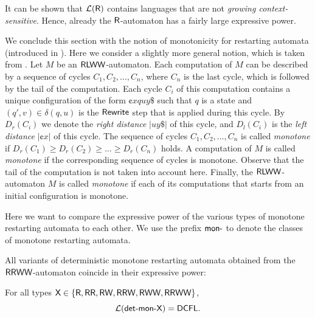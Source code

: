 It can be shown that ${\mathcal{L}}(\mbox{\sf R})$ contains languages that are not \emph{growing context-sensitive}. Hence, already the $\mbox{\sf R}$-automaton has a fairly large expressive power.

We conclude this section with the notion of monotonicity for restarting automata (introduced in \cite{JMPV97}). Here we consider a slightly more general notion, which is taken from \cite{JMPV07}. Let $M$ be an  $\mbox{\sf RLWW}$-automaton. Each computation of $M$ can be described by a sequence of cycles $C_1, C_2, \ldots, C_n$, where $C_n$ is the last cycle, which is followed by the tail of the computation. Each cycle $C_i$ of this computation contains a unique configuration of the form $\cent x q u y \$$ such that $q$ is a state and $(q', v) \in \delta(q, u)$ is the \index{$\Rewrite$}$\Rewrite$ step that is applied during this cycle. By $D_r(C_i)$ we denote the \emph{right distance} $|u y \$|$ of this cycle, and $D_l(C_i)$ is the \emph{left distance} $|\cent x|$ of this cycle. The sequence of cycles $C_1, C_2, \ldots, C_n$ is called \emph{monotone} if $D_r(C_1) \ge D_r(C_2) \ge \ldots \ge D_r(C_n)$ holds. A computation of $M$ is called \emph{monotone} if the corresponding sequence of cycles is monotone. Observe that the tail of the computation is not taken into account here. Finally, the $\mbox{\sf RLWW}$-automaton $M$ is called \emph{monotone} if each of its computations that starts from an initial configuration is monotone.

Here we want to compare the expressive power of the various types of monotone restarting automata to each other. We use the prefix \index{$\monPrefix$}$\monPrefix$ to denote the classes of monotone restarting automata.

All variants of 
deterministic monotone restarting automata obtained from the $\mbox{\sf RRWW}$-automaton coincide in their expressive power:

\index{$\DCFL$}
\begin{theorem}
For all types $\mbox{\sf X} \in \{\mbox{\sf R}, \mbox{\sf RR}, \mbox{\sf RW}, \mbox{\sf RRW}, \mbox{\sf RWW}, \mbox{\sf RRWW}\}$, $$\calL{\detmonX} = \DCFL.$$
\end{theorem}

